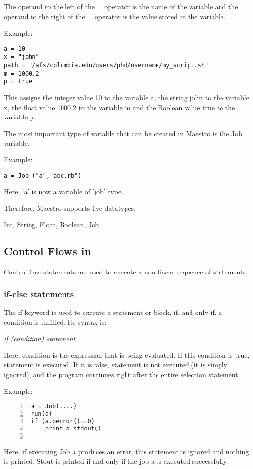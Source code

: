 The operand to the left of the = operator is the name of the variable and the operand to the right of the = operator is the value stored in the variable. 

Example:
\begin{verbatim}
a = 10
x = "john"
path = "/afs/columbia.edu/users/phd/username/my_script.sh"
m = 1000.2
p = true
\end{verbatim}

This assigns the integer value 10 to the variable a, the string john to the variable x, the float value 1000.2 to the variable m and the Boolean value true to the variable p.

The most important type of variable that can be created in Maestro is the Job variable.

Example:
\begin{verbatim}
a = Job ("a","abc.rb")
\end{verbatim}

Here, `a' is now a variable of 'job' type. 

Therefore, Maestro supports five datatypes;

Int, String, Float, Boolean, Job

\subsection*{Control Flows in \lang{}}
Control flow statements are used to execute a non-linear sequence of statements.
\subsubsection*{if-else statements}
The if keyword is used to execute a statement or block, if, and only if, a condition is fulfilled. Its syntax is:

\textit{if (condition) statement}

Here, condition is the expression that is being evaluated. If this condition is true, statement is executed. If it is false, statement is not executed (it is simply ignored), and the program continues right after the entire selection statement.

Example:
\begin{Verbatim}[numbers=left]
a = Job(....)
run(a)
if (a.perror()==0)
    print a.stdout()
    
\end{Verbatim}

Here, if executing Job a produces an error, this statement is ignored and nothing is printed. Stout is printed if and only if the job a is executed successfully.

